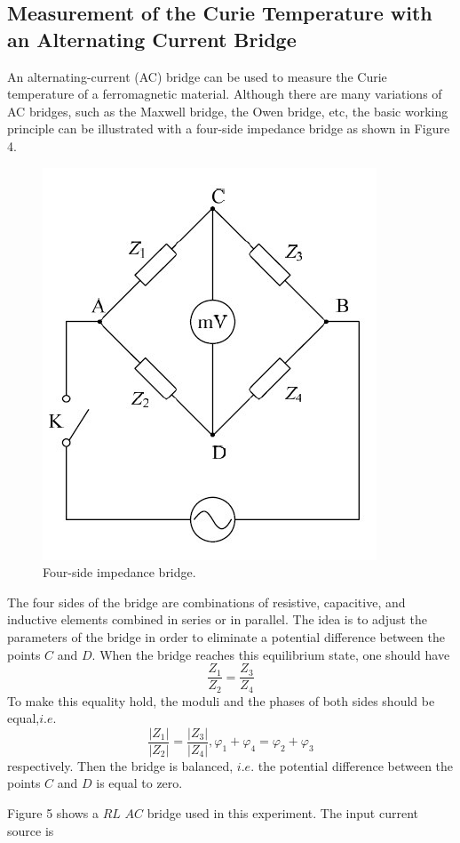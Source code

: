 \documentclass[12pt]{article}
\begin{document}
\subsection{Measurement of the Curie Temperature with an Alternating Current Bridge}
An alternating-current (AC) bridge can be used to measure the Curie temperature of
a ferromagnetic material. Although there are many variations of AC bridges, such as the
Maxwell bridge, the Owen bridge, etc, the basic working principle can be illustrated with
a four-side impedance bridge as shown in Figure 4.
\begin{figure}[H]
\centering
\includegraphics[scale=0.5]{P4.jpg}
\caption{Four-side impedance bridge.}
\end{figure}
The four sides of the bridge are combinations of resistive, capacitive, and inductive
elements combined in series or in parallel. The idea is to adjust the parameters of the
bridge in order to eliminate a potential difference between the points $C$ and $D$. When
the bridge reaches this equilibrium state, one should have
$$\frac{Z_1}{Z_2}=\frac{Z_3}{Z_4}$$
To make this equality hold, the moduli and the phases of both sides should be equal,$i.e$.
$$\frac{|Z_1|}{|Z_2|}=\frac{|Z_3|}{|Z_4|},\varphi_1+\varphi_4=\varphi_2+\varphi_3$$
respectively. Then the bridge is balanced, $i.e$. the potential difference between the points
$C$ and $D$ is equal to zero.
\par Figure 5 shows a $RL$ $AC$ bridge used in this experiment. The input current source is
\end{document}
